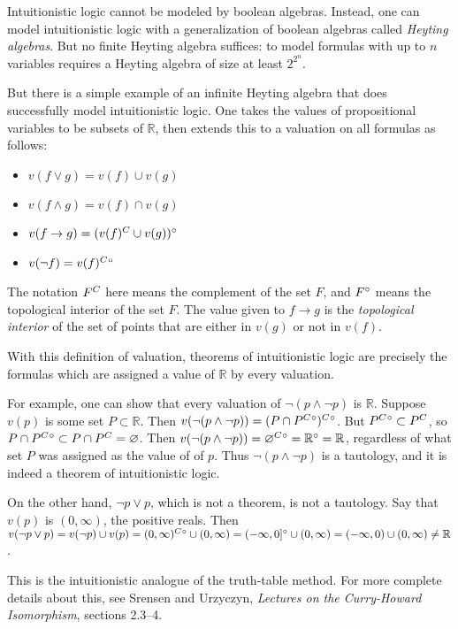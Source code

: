\documentclass{article}
\def\R{{\mathbb R}}
\def\comp#1{\smash{#1}^C\vphantom{#1}}
\def\inter#1{\smash{#1}^\circ\vphantom{#1}}
\def\intercomp#1{\inter{\comp{#1}}}
\def\imp{\rightarrow}           %
\begin{document}
Intuitionistic logic cannot be modeled by boolean algebras.  Instead,
one can model intuitionistic logic with a generalization of boolean
algebras called {\em Heyting algebras\/}.  But no finite Heyting
algebra suffices: to model formulas with up to $n$ variables requires
a Heyting algebra of size at least $2^{2^n}$.

But there is a simple example of an infinite Heyting algebra that does
successfully model intuitionistic logic.  One takes the values of
propositional variables to be subsets of $\R$, then extends this to a
valuation on all formulas as follows:

\begin{itemize}
\item$ v(f\vee g) = v(f)\cup v(g)$
\item$ v(f\wedge g) = v(f)\cap v(g)$
\item$ v(f\imp g) = \inter{(\comp{v(f)} \cup v(g))}$
\item$ v(\neg f) = \intercomp{v(f)}$
\end{itemize}

The notation $\comp{F}$ here means the complement of the set
$F$, and $\inter{F}$ means the topological interior of the
set $F$.
The value given to
$f\imp g$ is the {\em topological interior\/} of the set of points
that are  either in $v(g)$ or not in $v(f)$.  

With this definition of valuation, theorems of intuitionistic logic
are precisely the formulas which are assigned a value of $\R$ by every
valuation. 

For example, one can show that every valuation of $\neg(p\wedge\neg
p)$ is $\R$.  Suppose $v(p)$ is some set $P\subset\R$.  Then
$v(\neg(p\wedge\neg p)) = \intercomp{(P\cap\intercomp P)}$.  But
$\intercomp P \subset \comp P$, so $P\cap\intercomp P \subset
P\cap\comp P = \varnothing$.  Then $v(\neg(p\wedge\neg p)) =
\intercomp\varnothing = \inter\R = \R$, regardless of what set $P$ was
assigned as the value of of $p$.  Thus $\neg(p\wedge\neg p)$ is a
tautology, and it is indeed a theorem of intuitionistic logic.

On the other hand, $\neg p\vee p$, which is not a theorem, is not a tautology.
Say that $v(p)$ is $(0, \infty)$, the positive reals.  Then $v(\neg p\vee p)
= v(\neg p) \cup v(p)
= \intercomp{(0, \infty)} \cup (0, \infty)
= \inter{(-\infty, 0]}    \cup (0, \infty) 
= (-\infty, 0)            \cup (0, \infty)
\ne\R$.

This is the intuitionistic analogue of the truth-table method. For
more complete details about this, see S{\oslash}rensen and Urzyczyn,
{\em Lectures on the Curry-Howard Isomorphism\/}, sections 2.3--4.
\end{document}
